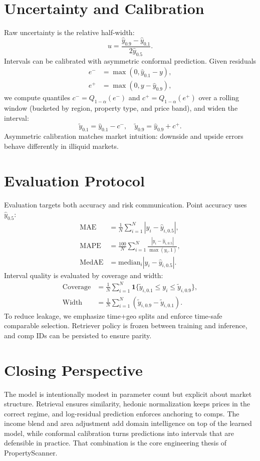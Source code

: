 \documentclass[11pt,a4paper]{article}
\begin{document}
\section{Uncertainty and Calibration}
Raw uncertainty is the relative half-width:
\begin{equation}
 u = \frac{\hat{y}_{0.9} - \hat{y}_{0.1}}{2 \hat{y}_{0.5}}.
\end{equation}
Intervals can be calibrated with asymmetric conformal prediction. Given
residuals
\begin{align}
 e^- &= \max(0, \hat{y}_{0.1} - y), \\
 e^+ &= \max(0, y - \hat{y}_{0.9}),
\end{align}
we compute quantiles $c^- = Q_{1-\alpha}(e^-)$ and
$c^+ = Q_{1-\alpha}(e^+)$ over a rolling window (bucketed by region, property
type, and price band), and widen the interval:
\begin{equation}
 \tilde{y}_{0.1} = \hat{y}_{0.1} - c^-, \quad
 \tilde{y}_{0.9} = \hat{y}_{0.9} + c^+.
\end{equation}
Asymmetric calibration matches market intuition: downside and upside errors
behave differently in illiquid markets.

\section{Evaluation Protocol}
Evaluation targets both accuracy and risk communication. Point accuracy uses
$\hat{y}_{0.5}$:
\begin{align}
\mathrm{MAE} &= \frac{1}{N} \sum_{i=1}^N |y_i - \hat{y}_{i,0.5}|, \\
\mathrm{MAPE} &= \frac{100}{N} \sum_{i=1}^N
\frac{|y_i - \hat{y}_{i,0.5}|}{\max(y_i, 1)}, \\
\mathrm{MedAE} &= \mathrm{median}_i |y_i - \hat{y}_{i,0.5}|.
\end{align}
Interval quality is evaluated by coverage and width:
\begin{align}
\mathrm{Coverage} &= \frac{1}{N} \sum_{i=1}^N
\mathbf{1}\{\tilde{y}_{i,0.1} \le y_i \le \tilde{y}_{i,0.9}\}, \\
\mathrm{Width} &= \frac{1}{N} \sum_{i=1}^N
(\tilde{y}_{i,0.9} - \tilde{y}_{i,0.1}).
\end{align}
To reduce leakage, we emphasize time+geo splits and enforce time-safe
comparable selection. Retriever policy is frozen between training and
inference, and comp IDs can be persisted to ensure parity.

\section{Closing Perspective}
The model is intentionally modest in parameter count but explicit about market
structure. Retrieval ensures similarity, hedonic normalization keeps prices in
the correct regime, and log-residual prediction enforces anchoring to comps.
The income blend and area adjustment add domain intelligence on top of the
learned model, while conformal calibration turns predictions into intervals
that are defensible in practice. That combination is the core engineering
thesis of PropertyScanner.
\end{document}
